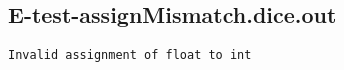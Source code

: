 \subsection{E-test-assignMismatch.dice.out}
\begin{verbatim}
Invalid assignment of float to int

\end{verbatim}
